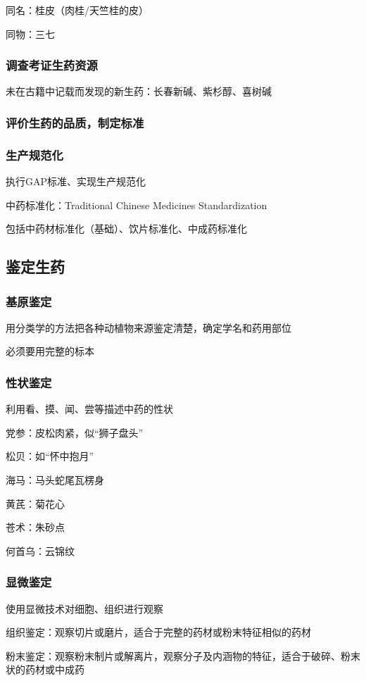 同名：桂皮（肉桂/天竺桂的皮）

同物：三七
\subsubsection*{调查考证生药资源}%
\label{subsub:调查考证生药资源}
未在古籍中记载而发现的新生药：长春新碱、紫杉醇、喜树碱

\subsubsection*{评价生药的品质，制定标准}%
\label{subsub:评价生药的品质-制定标准}

\subsubsection*{生产规范化}%
\label{subsub:生产规范化}
执行GAP标准、实现生产规范化
\begin{defi}
    中药标准化：Traditional Chinese Medicines Standardization

    包括中药材标准化（基础）、饮片标准化、中成药标准化
\end{defi}

\subsection{鉴定生药}%
\label{sub:鉴定生药}
\subsubsection*{基原鉴定}%
\label{subsub:基原鉴定}
用分类学的方法把各种动植物来源鉴定清楚，确定学名和药用部位
\begin{notation}
    必须要用完整的标本
\end{notation}
\subsubsection*{性状鉴定}%
\label{subsub:性状鉴定}
利用看、摸、闻、尝等描述中药的性状
\begin{eg}
    党参：皮松肉紧，似“狮子盘头”

    松贝：如“怀中抱月”

    海马：马头蛇尾瓦楞身

    黄芪：菊花心

    苍术：朱砂点

    何首乌：云锦纹
\end{eg}
\subsubsection*{显微鉴定}%
\label{subsub:显微鉴定}
使用显微技术对细胞、组织进行观察
\begin{notation}
    组织鉴定：观察切片或磨片，适合于完整的药材或粉末特征相似的药材

    粉末鉴定：观察粉末制片或解离片，观察分子及内涵物的特征，适合于破碎、粉末状的药材或中成药
\end{notation}
